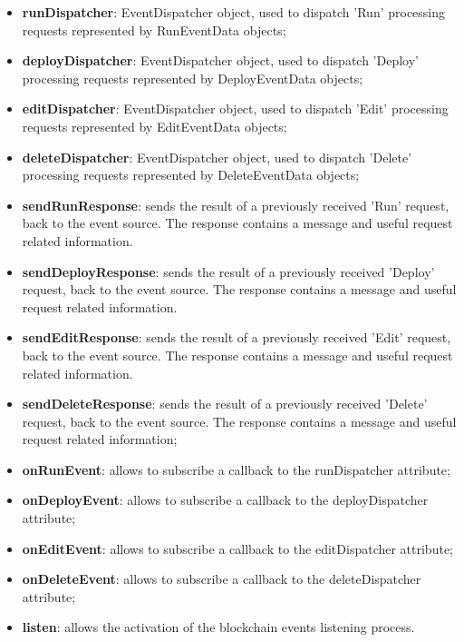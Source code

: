	\begin{itemize}
		\item \textbf{runDispatcher}: EventDispatcher object, used to dispatch 'Run' processing requests represented by RunEventData objects;
		\item \textbf{deployDispatcher}: EventDispatcher object, used to dispatch 'Deploy' processing requests represented by DeployEventData objects;
		\item \textbf{editDispatcher}: EventDispatcher object, used to dispatch 'Edit' processing requests represented by EditEventData objects;
		\item \textbf{deleteDispatcher}: EventDispatcher object, used to dispatch 'Delete' processing requests represented by DeleteEventData objects;
	\end{itemize}
	\begin{itemize}
		\item \textbf{sendRunResponse}: sends the result of a previously received 'Run' request, back to the event source. The response contains a message and useful request related information.
		\item \textbf{sendDeployResponse}: sends the result of a previously received 'Deploy' request, back to the event source. The response contains a message and useful request related information.
		\item \textbf{sendEditResponse}: sends the result of a previously received 'Edit' request, back to the event source. The response contains a message and useful request related information.
		\item \textbf{sendDeleteResponse}: sends the result of a previously received 'Delete' request, back to the event source. The response contains a message and useful request related information;
		\item \textbf{onRunEvent}: allows to subscribe a callback to the runDispatcher attribute;
		\item \textbf{onDeployEvent}: allows to subscribe a callback to the deployDispatcher attribute;
		\item \textbf{onEditEvent}: allows to subscribe a callback to the editDispatcher attribute;
		\item \textbf{onDeleteEvent}: allows to subscribe a callback to the deleteDispatcher attribute;
		\item \textbf{listen}: allows the activation of the blockchain events listening process.
	\end{itemize}
